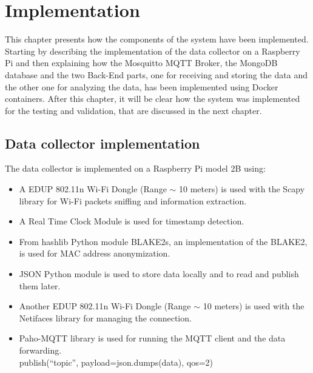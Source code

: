 \chapter{Implementation}
\label{cha:implementation}
\vspace{0.4 cm} 

This chapter presents how the components of the system have been implemented.
Starting by describing the implementation of the data collector on a Raspberry Pi and then explaining how the Mosquitto MQTT Broker, the MongoDB database and the two Back-End parts, one for receiving and storing the data and the other one for analyzing the data, has been implemented using Docker containers. After this chapter, it will be clear how the system was implemented for the testing and validation, that are discussed in the next chapter.


\section{Data collector implementation}
\label{sec:collector}
\vspace{0.2 cm} 

The data collector is implemented on a Raspberry Pi model 2B using:
\begin{itemize}
  \item A EDUP 802.11n Wi-Fi Dongle (Range $\sim$ 10 meters) is used with the Scapy library for Wi-Fi packets sniffing and information extraction.
  \item A Real Time Clock Module is used for timestamp detection.
  \item From hashlib Python module BLAKE2s, an implementation of the BLAKE2, is used for MAC address anonymization.
  \item JSON Python module is used to store data locally and to read and publish them later.
  \item Another EDUP 802.11n Wi-Fi Dongle (Range $\sim$ 10 meters) is used with the Netifaces library for managing the connection.
  \item Paho-MQTT library is used for running the MQTT client and the data forwarding.\\publish(``topic'', payload=json.dumps(data), qos=2)
\end{itemize}



